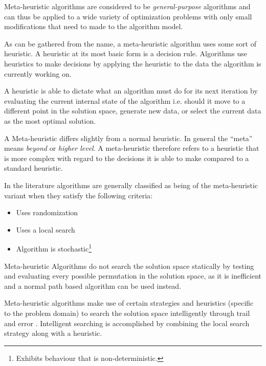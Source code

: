 Meta-heuristic algorithms are considered to be \emph{general-purpose} algorithms and can thus be applied to a wide variety of optimization problems with only small modifications that need to made to the algorithm model\cite{MetaGraph}.

As can be gathered from the name, a meta-heuristic algorithm uses some sort of heuristic. A heuristic at its most basic form is a decision rule. Algorithms use heuristics to make decisions by applying the heuristic to the data the algorithm is currently working on\cite{AIModernApproach,NatureInspiredMetaHeuristic}.

A heuristic is able to dictate what an algorithm must do for its next iteration by evaluating the current internal state of the algorithm  i.e. should it move to a different point in the solution space, generate new data, or select the current data as the most optimal solution\cite{AIModernApproach,NatureInspiredMetaHeuristic}.

A Meta-heuristic differs slightly from a normal heuristic. In general the ``meta'' means \emph{beyond} or \emph{higher level}\cite{AIModernApproach,NatureInspiredMetaHeuristic}. A meta-heuristic therefore refers to a heuristic that is more complex with regard to the decisions it is able to make compared to a standard heuristic\cite{AIModernApproach,NatureInspiredMetaHeuristic}.

In the literature algorithms are generally classified as being of the meta-heuristic variant when they satisfy the following criteria\cite{AIModernApproach,NatureInspiredMetaHeuristic}:
\begin{itemize}
	\item Uses randomization
	\item Uses a local search
	\item Algorithm is stochastic\footnote{Exhibits behaviour that is non-deterministic.}
\end{itemize}

Meta-heuristic Algorithms do not search the solution space statically by testing and evaluating every possible permutation in the solution space, as it is inefficient and a normal path based algorithm can be used instead\cite{MetaAgricultural}.

Meta-heuristic algorithms make use of certain strategies and heuristics (specific to the problem domain) to search the solution space intelligently through trail and error \cite{MetaAgricultural}. Intelligent searching is accomplished by combining the local search strategy along with a heuristic\cite{NatureInspiredMetaHeuristic,AIModernApproach,CompuIntelligenceIntro}. 

